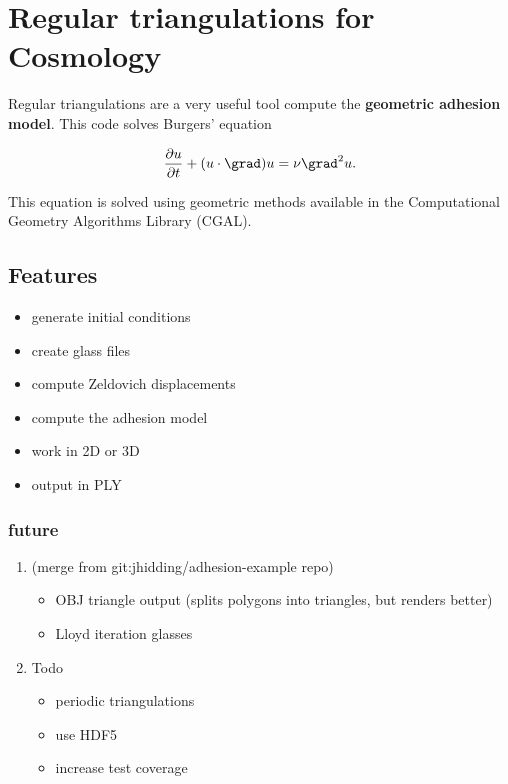 \documentclass[11pt]{article}
\author{Johannes Hidding}
\date{\today}
\title{}
\begin{document}
\tableofcontents

\section{Regular triangulations for Cosmology}
\label{sec:orgbf10868}

Regular triangulations are a very useful tool compute the \textbf{geometric
adhesion model}.  This code solves Burgers' equation

\[\frac{\partial u}{\partial t} + (u \cdot \grad)u = \nu \grad^2 u.\]

This equation is solved using geometric methods available in the
Computational Geometry Algorithms Library (CGAL).

\subsection{Features}
\label{sec:orgb3c7d53}
\begin{itemize}
\item generate initial conditions
\item create glass files
\item compute Zeldovich displacements
\item compute the adhesion model
\item work in 2D or 3D
\item output in PLY
\end{itemize}

\subsubsection{future}
\label{sec:org48fa9d4}
\begin{enumerate}
\item (merge from git:jhidding/adhesion-example repo)
\label{sec:orgf6612ee}
\begin{itemize}
\item OBJ triangle output (splits polygons into triangles, but renders better)
\item Lloyd iteration glasses
\end{itemize}
\item Todo
\label{sec:org3579565}
\begin{itemize}
\item periodic triangulations
\item use HDF5
\item increase test coverage
\end{itemize}
\end{enumerate}
\end{document}
